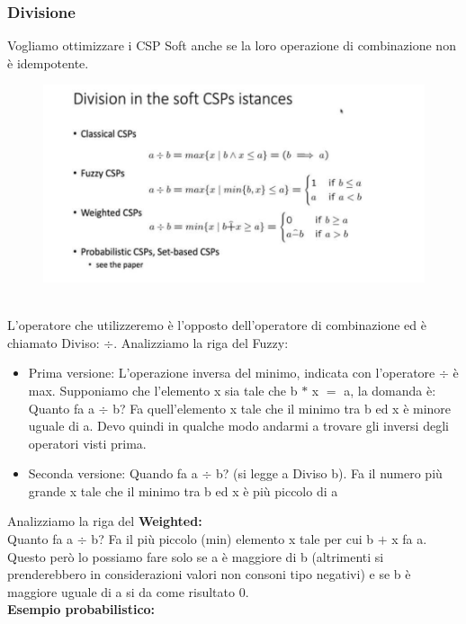 \subsubsection{Divisione}
Vogliamo ottimizzare i CSP Soft anche se la loro operazione di combinazione non
è idempotente.
\begin{figure}[htp]
    \centering
    \includegraphics[width=12cm, keepaspectratio]{img/Cap5/DIvisione.png}
\end{figure}
\\L'operatore che utilizzeremo è l'opposto dell'operatore di combinazione ed è
chiamato Diviso: $\div$. Analizziamo la riga del Fuzzy:
\begin{itemize}
    \item Prima versione: L'operazione inversa del minimo, indicata con
          l'operatore $\div$ è max. Supponiamo che l'elemento x sia tale che b $*$ x
          $=$ a, la domanda è: Quanto fa a $\div$ b? Fa quell'elemento x tale che il
          minimo tra b ed x è minore uguale di a. Devo quindi in qualche modo andarmi
          a trovare gli inversi degli operatori visti prima.
    \item  Seconda versione: Quando fa a $\div$ b? (si legge a Diviso b). Fa il
          numero più grande x tale che il minimo tra b ed x è più piccolo di a
\end{itemize}
Analizziamo la riga del \textbf{Weighted:} \\Quanto fa a $\div$ b? Fa il più
piccolo (min) elemento x tale per cui b $+$ x fa a. Questo però lo possiamo fare
solo se a è maggiore di b (altrimenti si prenderebbero in considerazioni valori
non consoni tipo negativi) e se b è maggiore uguale di a si da come risultato 0.
\\\textbf{Esempio probabilistico:}
